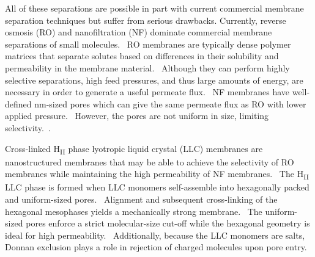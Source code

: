 \documentclass[journal=jpcbfk,manuscript=article]{achemso}
\begin{document}
  All of these separations are possible in part with current commercial membrane
  separation techniques but suffer from serious drawbacks. Currently, reverse 
  osmosis (RO) and nanofiltration (NF) dominate commercial membrane separations
  of small molecules.~\cite{warsinger_review_2018} RO membranes are typically
  dense polymer matrices that separate solutes based on differences in their
  solubility and permeability in the membrane material.~\cite{fritzmann_state---art_2007}
  Although they can perform highly selective separations, high feed pressures,
  and thus large amounts of energy, are necessary in order to generate a 
  useful permeate flux.~\cite{van_der_bruggen_review_2003} NF membranes have 
  well-defined nm-sized pores which can give the same permeate flux as RO
  with lower applied pressure.~\cite{hilal_comprehensive_2004} However, the 
  pores are not uniform in size, limiting selectivity.~\cite{werber_materials_2016}.
  

  Cross-linked H\textsubscript{II} phase lyotropic liquid crystal (LLC) 
  membranes are nanostructured membranes that may be able to achieve the
  selectivity of RO membranes while maintaining the high permeability
  of NF membranes.~\cite{zhou_supported_2005} The H\textsubscript{II} LLC
  phase is formed when LLC monomers self-assemble into hexagonally packed
  and uniform-sized pores.~\cite{smith_ordered_1997} Alignment and subsequent
  cross-linking of the hexagonal mesophases yields a mechanically strong
  membrane.~\cite{feng_scalable_2014,feng_thin_2016} The uniform-sized pores
  enforce a strict molecular-size cut-off while the hexagonal geometry is 
  ideal for high permeability.~\cite{zhou_supported_2005} Additionally, 
  because the LLC monomers are salts, Donnan exclusion plays a role in 
  rejection of charged molecules upon pore entry.~\cite{donnan_theory_1995}
  
\end{document}
